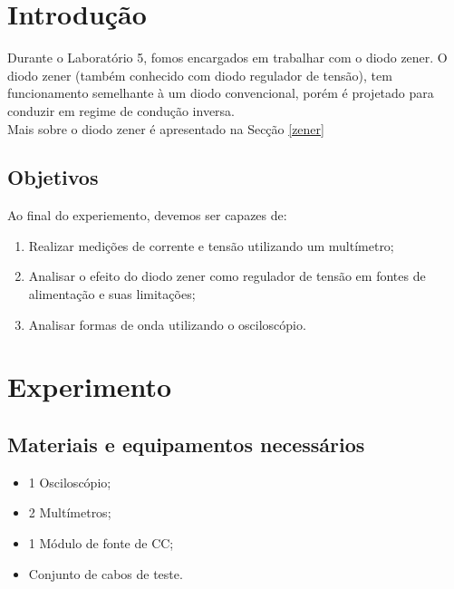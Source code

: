 \documentclass{article}
\begin{document}

\newpage

\thispagestyle{empty}
\tableofcontents
\newpage

\section{Introdução}

Durante o Laboratório 5, fomos encargados em trabalhar com o diodo zener. O diodo zener (também conhecido com diodo regulador de tensão), tem funcionamento semelhante à um diodo convencional, porém é projetado para conduzir em regime de condução inversa. \\

Mais sobre o diodo zener é apresentado na Secção \ref{zener}

\subsection{Objetivos}
Ao final do experiemento, devemos ser capazes de:


\begin{tcolorbox}
    \begin{enumerate}
        \large
        \item Realizar medições de corrente e tensão utilizando um multímetro;
        \item Analisar o efeito do diodo zener como regulador de tensão em fontes de alimentação e suas limitações;
        \item Analisar formas de onda utilizando o osciloscópio.
    \end{enumerate}
\end{tcolorbox}

\section{Experimento}

\subsection{Materiais e equipamentos necessários}

\begin{tcolorbox}
    \begin{itemize}
        \large
        \item 1 Osciloscópio;
        \item 2 Multímetros;
        \item 1 Módulo de fonte de CC;
        \item Conjunto de cabos de teste.
    \end{itemize}
\end{tcolorbox}
\end{document}
